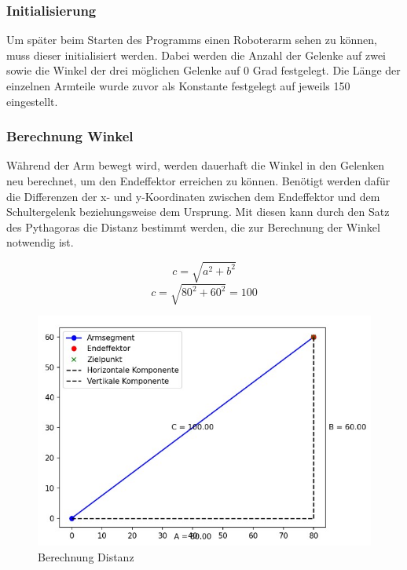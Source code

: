 \documentclass[12pt]{article}
\begin{document}
    \subsubsection{Initialisierung}
    Um später beim Starten des Programms einen Roboterarm sehen zu können, muss dieser initialisiert
    werden. Dabei werden die Anzahl der Gelenke auf zwei sowie die Winkel der drei möglichen Gelenke
    auf 0 Grad festgelegt. Die Länge der einzelnen Armteile wurde zuvor als Konstante festgelegt auf
    jeweils 150 eingestellt.

    

    \subsubsection{Berechnung Winkel}
    Während der Arm bewegt wird, werden dauerhaft die Winkel in den Gelenken neu berechnet, um den
    Endeffektor erreichen zu können. Benötigt werden dafür die Differenzen der x- und y-Koordinaten
    zwischen dem Endeffektor und dem Schultergelenk beziehungsweise dem Ursprung. Mit diesen kann durch
    den Satz des Pythagoras die Distanz bestimmt werden, die zur Berechnung der Winkel notwendig ist.

    \[
        c = \sqrt{a^2 + b^2}
    \]
    \[
        c = \sqrt{80^2 + 60^2} = 100
    \]

    \begin{figure}[h!]
        \centering
        \includegraphics[width = \linewidth]{Bild 1}
        \caption{Berechnung Distanz}
    \end{figure}
\end{document}
